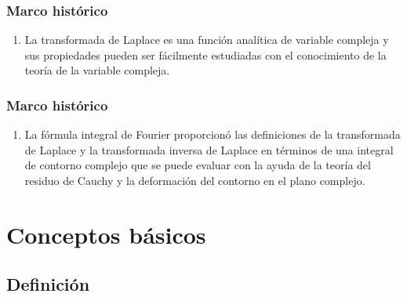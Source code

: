 \documentclass[12pt]{beamer}
\begin{document}
\begin{frame}
\frametitle{Marco histórico}
\begin{enumerate}[<+->]
\conti
\item La transformada de Laplace es una función analítica de variable compleja y sus propiedades pueden ser fácilmente estudiadas con el conocimiento de la teoría de la variable compleja.
\seti
\end{enumerate}
\end{frame}
\begin{frame}
\frametitle{Marco histórico}
\begin{enumerate}[<+->]
\conti
\item La fórmula integral de Fourier proporcionó las definiciones de la transformada de Laplace y la transformada inversa de Laplace en términos de una integral de contorno complejo que se puede evaluar con la ayuda de la teoría del residuo de Cauchy y la deformación del contorno en el plano complejo.
\end{enumerate}
\end{frame}

\section{Conceptos básicos}
\subsection{Definición}
\end{document}
